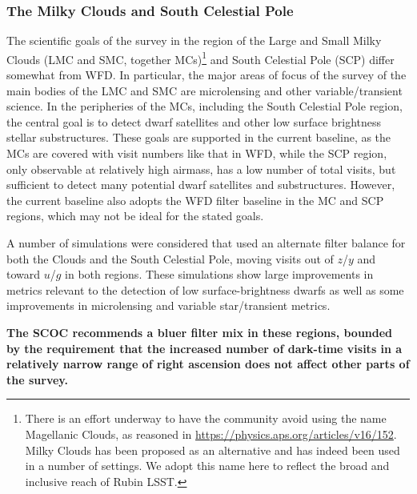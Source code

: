 \subsubsection{The Milky Clouds and South Celestial Pole}\label{sec:subG:specialregions}

The scientific goals of the survey in the region of the Large and Small Milky Clouds (LMC and SMC, together MCs)\footnote{There is an effort underway to have the community avoid using the name Magellanic Clouds, as reasoned in \url{https://physics.aps.org/articles/v16/152}. Milky Clouds has been proposed as an alternative and has indeed been used in a number of settings. We adopt this name here to reflect the broad and inclusive reach of Rubin LSST.} and South Celestial Pole (SCP) differ somewhat from WFD. In particular, the major areas of focus of the survey of the main bodies of the LMC and SMC are microlensing and other variable/transient science. In the peripheries of the MCs, including the South Celestial Pole region, the central goal is to detect dwarf satellites and other low surface brightness stellar substructures.
These goals are supported in the current baseline, as the MCs are covered with visit numbers like that in WFD, while the SCP region, only observable at relatively high airmass, has a low number of total visits, but sufficient to detect many potential dwarf satellites and substructures. However, the current baseline also adopts the WFD filter baseline in the MC and SCP regions, which may not be ideal for the stated goals.


A number of simulations were considered that used an alternate filter balance for both the Clouds and the South Celestial Pole, moving visits out of $z$/$y$ and toward $u$/$g$ in both regions. These simulations show large improvements in metrics relevant to the detection of low surface-brightness dwarfs as well as some improvements in microlensing and variable star/transient metrics. 

{\bf The SCOC recommends a bluer filter mix in these regions, bounded by the requirement that the increased number of dark-time visits in a relatively narrow range of right ascension does not affect other parts of the survey.} 


